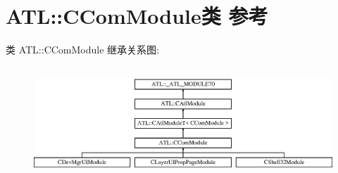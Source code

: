 \hypertarget{class_a_t_l_1_1_c_com_module}{}\section{A\+TL\+:\+:C\+Com\+Module类 参考}
\label{class_a_t_l_1_1_c_com_module}
类 A\+TL\+:\+:C\+Com\+Module 继承关系图\+:\begin{figure}[H]
\begin{center}
\leavevmode
\includegraphics[height=4.204205cm]{class_a_t_l_1_1_c_com_module}
\end{center}
\end{figure}
